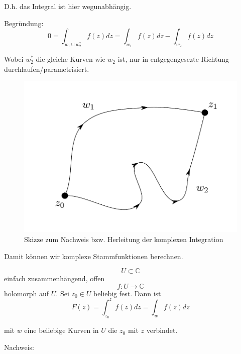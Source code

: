 \documentclass[10pt,a4paper]{article}
\begin{document}
D.h. das Integral ist hier wegunabhängig.

Begründung: $$0=\int_{w_1 \cup w_2^{*}} f(z) dz = \int_{w_1} f(z) dz - \int_{w_2} f(z) dz$$

Wobei $w_2^{*}$ die gleiche Kurven wie $w_2$ ist, nur in entgegengesezte Richtung durchlaufen/parametrisiert.

\begin{figure}[H]
\includegraphics[width=\textwidth]{images/wegunabhangigkeit}
\caption{Skizze zum Nachweis bzw. Herleitung der komplexen Integration}
\end{figure}


Damit können wir komplexe Stammfunktionen berechnen.

\begin{satz}
$$U \subset \mathbb{C} $$ einfach zusammenhängend, offen $$f:U \rightarrow \mathbb{C}$$ holomorph auf $U$. Sei $z_0 \in U$ beliebig fest. Dann ist 
$$F(z) = \int_{z_0}^{z} f(z) dz = \int_{w} f(z) dz$$

mit $w$ eine beliebige Kurven in $U$ die $z_0$ mit $z$ verbindet.

\end{satz}

Nachweis:
\end{document}
